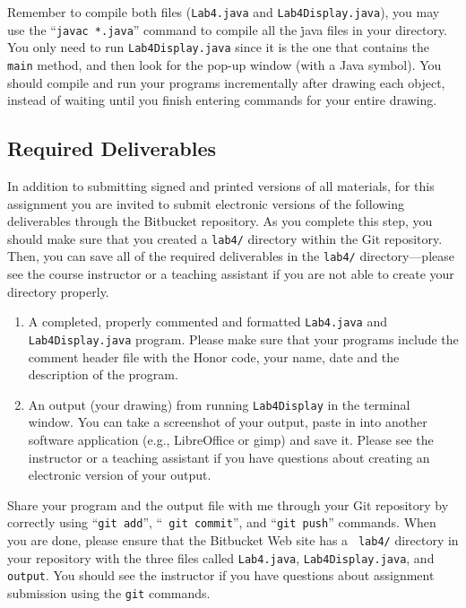\begin{sloppypar}
Remember to compile both files ({\tt Lab4.java} and {\tt Lab4Display.java}), you may use the ``{\tt javac *.java}''
command to compile all the {\.java} files in your directory. You only need to run {\tt Lab4Display.java} since it is the
one that contains the {\tt main} method, and then look for the pop-up window (with a Java symbol). You should compile and run
your programs incrementally after drawing each object, instead of waiting until you finish entering commands for your
entire drawing. 
\end{sloppypar}

\subsection*{Required Deliverables}

In addition to submitting signed and printed versions of all materials, for this assignment you are invited to submit
electronic versions of the following deliverables through the Bitbucket repository. As you complete this step, you
should make sure that you created a {\tt lab4/} directory within the Git repository.  Then, you can save all of the
required deliverables in the {\tt lab4/} directory---please see the course instructor or a teaching assistant if you are
not able to create your directory properly. 

\begin{enumerate}

        \item A completed, properly commented and formatted {\tt Lab4.java} and {\tt Lab4Display.java} program. Please
          make sure that your programs  include the comment header file with the Honor code, your name, date and the
          description of the program.

        \item An output (your drawing) from running {\tt Lab4Display} in the terminal window. You can take a screenshot
          of your output, paste in into another software application (e.g., LibreOffice or gimp) and save it. Please see
          the instructor or a teaching assistant if you have questions about creating an electronic version of your
          output.

\end{enumerate}

\vspace{-0.1in}

Share your program and the output file with me through your Git repository by correctly using ``{\tt git add}'', ``{\tt
git commit}'', and ``{\tt git push}'' commands. When you are done, please ensure that the Bitbucket Web site has a {\tt
lab4/} directory in your repository with the three files called {\tt Lab4.java}, {\tt Lab4Display.java}, and {\tt
output}. You should see the instructor if you have questions about assignment submission using the {\tt git} commands.





